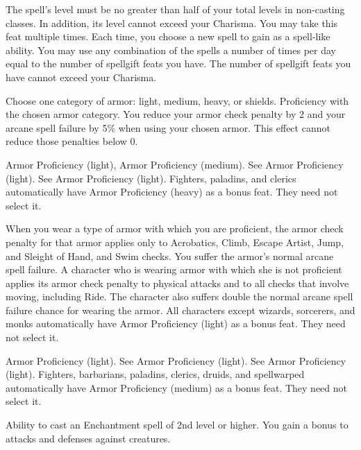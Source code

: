 The spell's level must be no greater than half of your total levels in non-casting classes. In addition, its level cannot exceed your Charisma.
 You may take this feat multiple times. Each time, you choose a new spell to gain as a spell-like ability. You may use any combination of the spells a number of times per day equal to the number of spellgift feats you have. The number of spellgift feats you have cannot exceed your Charisma.

Choose one category of armor: light, medium, heavy, or shields.
 Proficiency with the chosen armor category.
 You reduce your armor check penalty by 2 and your arcane spell failure by 5\% when using your chosen armor. This effect cannot reduce those penalties below 0.

 Armor Proficiency (light), Armor Proficiency (medium).
 See Armor Proficiency (light).
 See Armor Proficiency (light).
 Fighters, paladins, and clerics automatically have Armor Proficiency (heavy) as a bonus feat. They need not select it.

 When you wear a type of armor with which you are proficient, the armor check penalty for that armor applies only to Acrobatics, Climb, Escape Artist, Jump, and Sleight of Hand, and Swim checks. You suffer the armor's normal arcane spell failure.
 A character who is wearing armor with which she is not proficient applies its armor check penalty to physical attacks and to all checks that involve moving, including Ride. The character also suffers double the normal arcane spell failure chance for wearing the armor.
 All characters except wizards, sorcerers, and monks automatically have Armor Proficiency (light) as a bonus feat. They need not select it.

 Armor Proficiency (light).
 See Armor Proficiency (light).
 See Armor Proficiency (light).
 Fighters, barbarians, paladins, clerics, druids, and spellwarped automatically have Armor Proficiency (medium) as a bonus feat. They need not select it.

\featpre Ability to cast an Enchantment spell of 2nd level or higher.
\featben You gain a  bonus to attacks and defenses against \bewildered creatures.
\featspecial \featbanenotes

